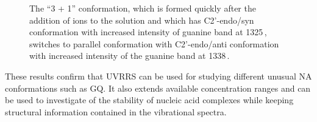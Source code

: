\begin{figure}
	\centering
	
	\vspace{3mm}
	\caption[%
		Effect of standard anealing and incubation at 37\,\textdegree{}C on UVRRS
		of -Tel22.
	]{%
		The “3 + 1” conformation, which is formed quickly after the addition of
		 ions to the solution and which has C2'-endo/syn conformation with
		increased intensity of guanine band at 1325\,\icm{}, switches to parallel
		conformation with C2'-endo/anti conformation with increased intensity of
		the guanine band at 1338\,\icm{}.
	}
	\label{\figlabel{telXXII:spectra}}
\end{figure}

These results confirm that UVRRS can be used for studying
different unusual NA conformations such as GQ. It also extends available
concentration ranges and can be used to investigate of the stability of
nucleic acid complexes while keeping structural information contained in the
vibrational spectra.
